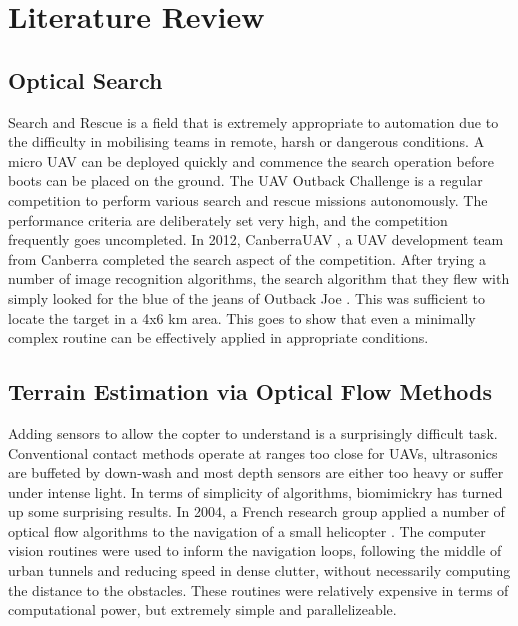 \documentclass[a4paper, 11pt, titlepage]{article}
\begin{document}
  \section{Literature Review}

    \subsection{Optical Search}
      Search and Rescue is a field that is extremely appropriate to automation due to the difficulty in mobilising teams in remote, harsh or dangerous conditions.  A micro UAV can be deployed quickly and commence the search operation before boots can be placed on the ground.
      The UAV Outback Challenge \cite{OutbackChallenge} is a regular competition to perform various search and rescue missions autonomously.  The performance criteria are deliberately set very high, and the competition frequently goes uncompleted.  
      In 2012, CanberraUAV \cite{canberrauav}, a UAV development team from Canberra completed the search aspect of the competition.
      After trying a number of image recognition algorithms, the search algorithm that they flew with simply looked for the blue of the jeans of Outback Joe \cite{tridge}. This was sufficient to locate the target in a 4x6 km area.  This goes to show that even a minimally complex routine can be effectively applied in appropriate conditions.

    \subsection{Terrain Estimation via Optical Flow Methods}
      Adding sensors to allow the copter to understand is a surprisingly difficult task.  Conventional contact methods operate at ranges too close for UAVs, ultrasonics are buffeted by down-wash and most depth sensors are either too heavy or suffer under intense light.
      In terms of simplicity of algorithms, biomimickry has turned up some surprising results.  In 2004, a French research group applied a number of optical flow algorithms to the navigation of a small helicopter \cite{InsectFlowMethods}.  The computer vision routines were used to inform the navigation loops, following the middle of urban tunnels and reducing speed in dense clutter, without necessarily computing the distance to the obstacles.  These routines were relatively expensive in terms of computational power, but extremely simple and parallelizeable.
\end{document}
